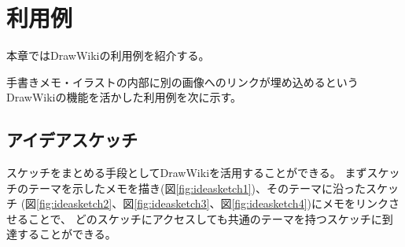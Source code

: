 \chapter{利用例}
\label{chap:riyourei}

本章ではDrawWikiの利用例を紹介する。

\newpage

手書きメモ・イラストの内部に別の画像へのリンクが埋め込めるというDrawWikiの機能を活かした利用例を次に示す。

\section{アイデアスケッチ}
\label{drawiki:normalmemo}
スケッチをまとめる手段としてDrawWikiを活用することができる。
まずスケッチのテーマを示したメモを描き(図\ref{fig:ideasketch1})、そのテーマに沿ったスケッチ
(図\ref{fig:ideasketch2}、図\ref{fig:ideasketch3}、図\ref{fig:ideasketch4})にメモをリンクさせることで、
どのスケッチにアクセスしても共通のテーマを持つスケッチに到達することができる。

